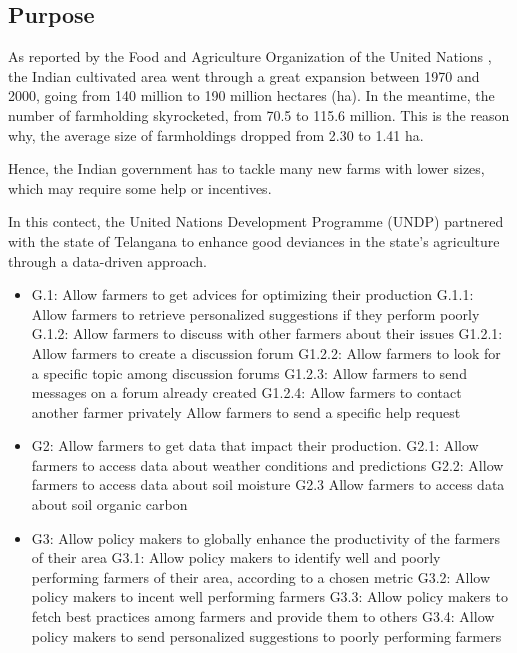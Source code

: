 \subsection{Purpose}
As reported by the Food and Agriculture Organization of the United Nations \cite{fao}, the Indian cultivated area went through a great expansion between 1970 and 2000, going from 140 million to 190 million hectares (ha). In the meantime, the number of farmholding skyrocketed, from 70.5 to 115.6 million. This is the reason why, the average size of farmholdings dropped from 2.30 to 1.41 ha. 

Hence, the Indian government has to tackle many new farms with lower sizes, which may require some help or incentives.

In this contect, the United Nations Development Programme (UNDP) partnered with the state of Telangana to enhance good deviances in the state's agriculture through a data-driven approach. 

\begin{itemize}
	\item
	G.1: Allow farmers to get advices for optimizing their production
	\subitem
	G.1.1: Allow farmers to retrieve personalized suggestions if they perform poorly
	\subitem
	G.1.2: Allow farmers to discuss with other farmers about their issues
	\subitem
	G1.2.1: Allow farmers to create a discussion forum
	\subitem
	G1.2.2: Allow farmers to look for a specific topic among discussion forums
	\subitem
	G1.2.3: Allow farmers to send messages on a forum already created
	\subitem
	G1.2.4: Allow farmers to contact another farmer privately	
	Allow farmers to send a specific help request
	\item
	G2: Allow farmers to get data that impact their production. 
	\subitem
	G2.1: Allow farmers to access data about weather conditions and predictions
	\subitem
	G2.2:
	Allow farmers to access data about soil moisture
	\subitem
	G2.3
	Allow farmers to access data about soil organic carbon
	\item
	G3: Allow policy makers to globally enhance the productivity of the farmers of their area
	\subitem
	G3.1: Allow policy makers to identify well and poorly performing farmers of their area, according to a chosen metric
	\subitem
	G3.2: Allow policy makers to incent well performing farmers
	\subitem
	G3.3: Allow policy makers to fetch best practices among farmers and provide them to others
	\subitem
	G3.4: Allow policy makers to send personalized suggestions to poorly performing farmers

	
\end{itemize}

